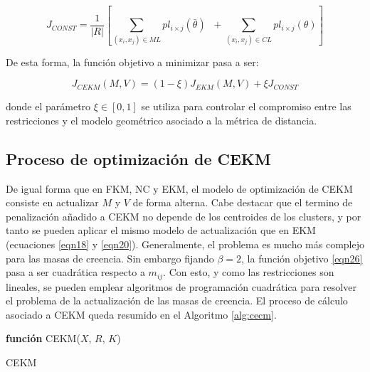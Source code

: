 \begin{equation}
J_{CONST} = \frac{1}{|R|} \left[\sum_{(x_i,x_j) \in ML} pl_{i\times j} (\bar{\theta})\;\; + \sum_{(x_i,x_j) \in CL} pl_{i\times j} (\theta)\right]
\label{eqn25}
\end{equation}

De esta forma, la función objetivo a minimizar pasa a ser:

\begin{equation}
J_{CEKM}(M,V) = (1- \xi)J_{EKM}(M,V) + \xi J_{CONST}
\label{eqn26}
\end{equation}

donde el parámetro $\xi \in [0,1]$ se utiliza para controlar el compromiso entre las restricciones y el modelo geométrico asociado a la métrica de distancia.

\subsection{Proceso de optimización de CEKM}

De igual forma que en \acs{FKM}, \acs{NC} y \acs{EKM}, el modelo de optimización de \acs{CEKM} consiste en actualizar $M$ y $V$ de forma alterna. Cabe destacar que el termino de penalización añadido a \acs{CEKM} no depende de los centroides de los clusters, y por tanto se pueden aplicar el mismo modelo de actualización que en \acs{EKM} (ecuaciones \ref{eqn18} y \ref{eqn20}). Generalmente, el problema es mucho más complejo para las masas de creencia. Sin embargo fijando $\beta = 2$, la función objetivo \ref{eqn26} pasa a ser cuadrática respecto a $m_{ij}$. Con esto, y como las restricciones son lineales, se pueden emplear algoritmos de programación cuadrática para resolver el problema de la actualización de las masas de creencia. El proceso de cálculo asociado a \acs{CEKM} queda resumido en el Algoritmo \ref{alg:cecm}. 


\begin{algorithm}
	
	\BlankLine
	\BlankLine
	\textbf{función} CEKM($X$, $R$, $K$) 
	\caption{\acf{CEKM}}
	\label{alg:cecm}
\end{algorithm}

